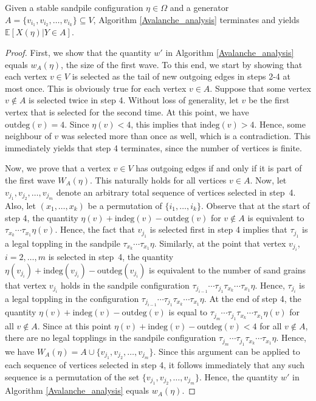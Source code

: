 \documentclass{article}
\begin{document}
\begin{theorem}\label{rec_to_alg}
    Given a stable sandpile configuration $\eta \in \Omega$ and a generator $A = \{v_{i_1}, v_{i_2}, \ldots, v_{i_k}\} \subseteq V$, Algorithm \ref{Avalanche_analysis} terminates and yields $\mathbb{E}[X(\eta)|Y \in A]$. 
\end{theorem}
\begin{proof}
    First, we show that the quantity $w'$ in Algorithm \ref{Avalanche_analysis} equals $w_A(\eta)$, the size of the first wave. To this end, we start by showing that each vertex $v \in V$ is selected as the tail of new outgoing edges in steps 2-4 at most once. This is obviously true for each vertex $v \in A$. Suppose that some vertex $v \notin A$ is selected twice in step 4. Without loss of generality, let $v$ be the first vertex that is selected for the second time. At this point, we have $\text{outdeg}(v) = 4$. Since $\eta(v) < 4$, this implies that $\text{indeg}(v) > 4$. Hence, some neighbour of $v$ was selected more than once as well, which is a contradiction.  This immediately yields that step 4 terminates, since the number of vertices is finite. 
    
    Now, we prove that a vertex $v \in V$ has outgoing edges if and only if it is part of the first wave $W_A(\eta)$. This naturally holds for all vertices $v \in A$. Now, let $v_{j_1}, v_{j_2}, \ldots, v_{j_m}$ denote an arbitrary total sequence of vertices selected in step~4. Also, let $(x_1, \ldots, x_k)$ be a permutation of $\{i_1, \ldots, i_k\}$. Observe that at the start of step 4, the quantity $\eta(v) + \text{indeg}(v) - \text{outdeg}(v)$ for $v \notin A$ is equivalent to $\tau_{x_k} \cdots \tau_{x_1} \eta(v)$. Hence, the fact that $v_{j_1}$ is selected first in step 4 implies that $\tau_{j_1}$ is a legal toppling in the sandpile $\tau_{x_k} \cdots \tau_{x_1} \eta$. Similarly, at the point that vertex $v_{j_i}$, $i = 2, \ldots, m$ is selected in step~4, the quantity $\eta(v_{j_i}) + \text{indeg}(v_{j_i}) - \text{outdeg}(v_{j_i})$ is equivalent to the number of sand grains that vertex $v_{j_i}$ holds in the sandpile configuration $\tau_{j_{i-1}} \cdots \tau_{j_1} \tau_{x_k} \cdots \tau_{x_1} \eta$. Hence, $\tau_{j_i}$ is a legal toppling in the configuration $\tau_{j_{i-1}} \cdots \tau_{j_1} \tau_{x_k} \cdots \tau_{x_1} \eta$. At the end of step 4, the quantity $\eta(v) + \text{indeg}(v) - \text{outdeg}(v)$ is equal to $\tau_{j_m} \cdots \tau_{j_1} \tau_{x_k} \cdots \tau_{x_1} \eta(v)$ for all $v \notin A$. Since at this point $\eta(v) + \text{indeg}(v) - \text{outdeg}(v) < 4$ for all $v \notin A$, there are no legal topplings in the sandpile configuration $\tau_{j_m} \cdots \tau_{j_1} \tau_{x_k} \cdots \tau_{x_1} \eta$. Hence, we have $W_A(\eta) = A \cup \{v_{j_1}, v_{j_2}, \ldots, v_{j_m}\}$. Since this argument can be applied to each sequence of vertices selected in step 4, it follows immediately that any such sequence is a permutation of the set $\{v_{j_1}, v_{j_2}, \ldots, v_{j_m}\}$. Hence, the quantity $w'$ in Algorithm \ref{Avalanche_analysis} equals $w_A(\eta)$.


\end{proof}
\end{document}
